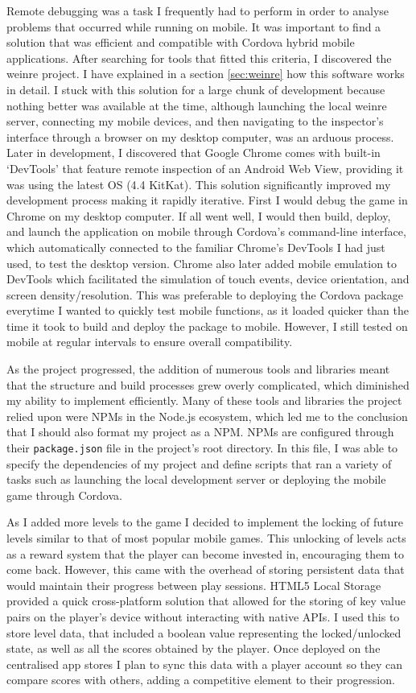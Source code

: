 \documentclass[final]{cmpreport}
\begin{document}
Remote debugging was a task I frequently had to perform in order to analyse problems that occurred while running on mobile. It was important to find a solution that was efficient and compatible with Cordova hybrid mobile applications. After searching for tools that fitted this criteria, I discovered the weinre project. I have explained in a section \ref{sec:weinre} how this software works in detail. I stuck with this solution for a large chunk of development because nothing better was available at the time, although launching the local weinre server, connecting my mobile devices, and then navigating to the inspector's interface through a browser on my desktop computer, was an arduous process. Later in development, I discovered that Google Chrome comes with built-in `DevTools' that feature remote inspection of an Android Web View, providing it was using the latest OS (4.4 KitKat). This solution significantly improved my development process making it rapidly iterative. First I would debug the game in Chrome on my desktop computer. If all went well, I would then build, deploy, and launch the application on mobile through Cordova's command-line interface, which automatically connected to the familiar Chrome's DevTools I had just used, to test the desktop version. Chrome also later added mobile emulation to DevTools which facilitated the simulation of touch events, device orientation, and screen density/resolution. This was preferable to deploying the Cordova package everytime I wanted to quickly test mobile functions, as it loaded quicker than the time it took to build and deploy the package to mobile. However, I still tested on mobile at regular intervals to ensure overall compatibility.

As the project progressed, the addition of numerous tools and libraries meant that the structure and build processes grew overly complicated, which diminished my ability to implement efficiently. Many of these tools and libraries the project relied upon were NPMs in the Node.js ecosystem, which led me to the conclusion that I should also format my project as a NPM. NPMs are configured through their \texttt{package.json} file in the project's root directory. In this file, I was able to specify the dependencies of my project and define scripts that ran a variety of tasks such as launching the local development server or deploying the mobile game through Cordova.

As I added more levels to the game I decided to implement the locking of future levels similar to that of most popular mobile games. This unlocking of levels acts as a reward system that the player can become invested in, encouraging them to come back. However, this came with the overhead of storing persistent data that would maintain their progress between play sessions. HTML5 Local Storage provided a quick cross-platform solution that allowed for the storing of key value pairs on the player's device without interacting with native APIs. I used this to store level data, that included a boolean value representing the locked/unlocked state, as well as all the scores obtained by the player. Once deployed on the centralised app stores I plan to sync this data with a player account so they can compare scores with others, adding a competitive element to their progression.
\end{document}
